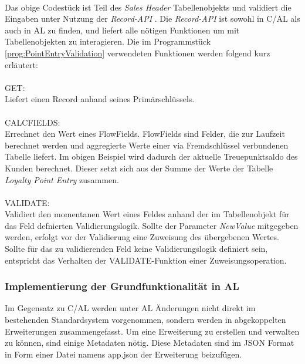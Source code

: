 \paragraph{}
Das obige Codestück ist Teil des \textit{Sales Header} Tabellenobjekts und validiert die Eingaben unter Nutzung der \textit{Record-API} \cite{msdnRecordAPI}. Die \textit{Record-API} ist sowohl in C/AL als auch in AL zu finden, und liefert alle nötigen Funktionen um mit Tabellenobjekten zu interagieren. Die im Programmstück \ref{prog:PointEntryValidation} verwendeten Funktionen werden folgend kurz erläutert:  \\ \\
GET: \\
Liefert einen Record anhand seines Primärschlüssels.\\ \\
CALCFIELDS: \\
Errechnet den Wert eines FlowFields. FlowFields sind Felder, die zur Laufzeit berechnet werden und aggregierte Werte einer via Fremdschlüssel verbundenen Tabelle liefert. Im obigen Beispiel wird dadurch der aktuelle Treuepunktsaldo des Kunden berechnet. Dieser setzt sich aus der Summe der Werte der Tabelle \textit{Loyalty Point Entry} zusammen.\\ \\
VALIDATE:  \\
Validiert den momentanen Wert eines Feldes anhand der im Tabellenobjekt für das Feld defnierten Validierungslogik. Sollte der Parameter \textit{NewValue} mitgegeben werden, erfolgt vor der Validierung eine Zuweisung des übergebenen Wertes. Sollte für das zu validierenden Feld keine Validierungslogik definiert sein, entspricht das Verhalten der VALIDATE-Funktion einer Zuweisungsoperation.\\

\pagebreak
\subsubsection{Implementierung der Grundfunktionalität in AL}

Im Gegensatz zu C/AL werden unter AL Änderungen nicht direkt im bestehenden Standardsystem vorgenommen, sondern werden in abgekoppelten Erweiterungen zusammengefasst. Um eine Erweiterung zu erstellen und verwalten zu können, sind einige Metadaten nötig. Diese Metadaten sind im JSON Format in Form einer Datei namens app.json der Erweiterung beizufügen. 

